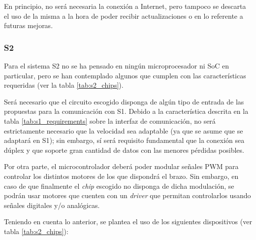 En principio, no será necesaria la conexión a Internet, pero tampoco se descarta el uso de la misma a la hora de poder recibir actualizaciones o en lo referente a futuras mejoras.

\subsubsection*{\ac{S2}}
Para el sistema \ac{S2} no se ha pensado en ningún microprocesador ni \ac{SoC} en particular, pero se han contemplado algunos que cumplen con las características requeridas (ver la tabla \ref{tab:s2_chips}).

Será necesario que el circuito escogido disponga de algún tipo de entrada de las propuestas para la comunicación con \ac{S1}. Debido a la característica descrita en la tabla \ref{tab:s1_requirements} sobre la interfaz de comunicación, no será estrictamente necesario que la velocidad sea adaptable (ya que se asume que se adaptará en \ac{S1}); sin embargo, sí será requisito fundamental que la conexión sea dúplex y que soporte gran cantidad de datos con las menores pérdidas posibles.

Por otra parte, el microcontrolador deberá poder modular señales \ac{PWM} para controlar los distintos motores de los que dispondrá el brazo. Sin embargo, en caso de que finalmente el \textit{chip} escogido no disponga de dicha modulación, se podrán usar motores que cuenten con un \textit{driver} que permitan controlarlos usando señales digitales y/o analógicas.

Teniendo en cuenta lo anterior, se plantea el uso de los siguientes dispositivos (ver tabla \ref{tab:s2_chips}):

